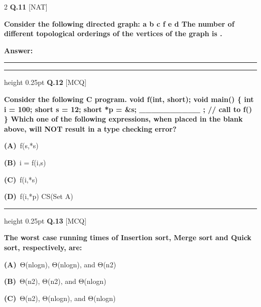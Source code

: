 \documentclass[a4paper,10pt,twoside]{article}
\begin{document}
\begin{multicols}{2}
\noindent\textbf{Q.11} \hfill {\footnotesize\textsf{[NAT]}}
\par\vspace{2pt}
{\bfseries Consider the following directed graph:
a
b
c
f
e
d
The number of different topological orderings of the vertices of the graph is
. \par}
\par\vspace{3pt}\noindent\textbf{Answer:} \rule{3.2cm}{0.4pt}
\par\vspace{6pt}\hrule height 0.25pt\vspace{6pt}
\noindent\textbf{Q.12} \hfill {\footnotesize\textsf{[MCQ]}}
\par\vspace{2pt}
{\bfseries Consider the following C program.
void f(int, short);
void main()
\{
int i = 100;
short s = 12;
short *p = \&s;
\_\_\_\_\_\_\_\_\_\_ ;
// call to f()
\}
Which one of the following expressions, when placed in the blank above, will NOT result in
a type checking error? \par}
\par\vspace{2pt}\noindent
\textbf{(A)}~f(s,*s)\par\vspace{2pt}\noindent
\textbf{(B)}~i = f(i,s)\par\vspace{2pt}\noindent
\textbf{(C)}~f(i,*s)\par\vspace{2pt}\noindent
\textbf{(D)}~f(i,*p) \newline CS(Set A)
\par\vspace{6pt}\hrule height 0.25pt\vspace{6pt}
\noindent\textbf{Q.13} \hfill {\footnotesize\textsf{[MCQ]}}
\par\vspace{2pt}
{\bfseries The worst case running times of Insertion sort, Merge sort and Quick sort, respectively, are: \par}
\par\vspace{2pt}\noindent
\textbf{(A)}~Θ(nlogn), Θ(nlogn), and Θ(n2)\par\vspace{2pt}\noindent
\textbf{(B)}~Θ(n2), Θ(n2), and Θ(nlogn)\par\vspace{2pt}\noindent
\textbf{(C)}~Θ(n2), Θ(nlogn), and Θ(nlogn)\par\vspace{2pt}\noindent

\end{multicols}
\end{document}
